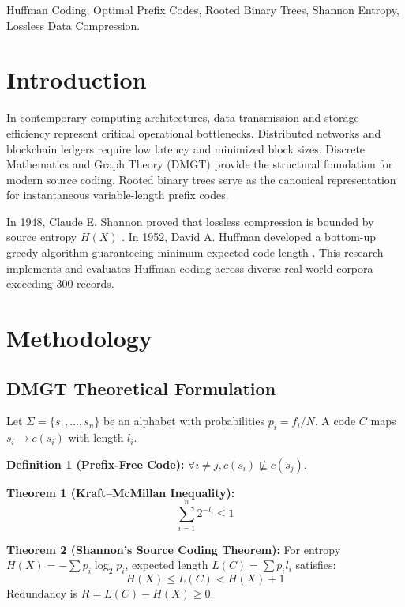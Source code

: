 \documentclass[conference]{IEEEtran}
\begin{document}
\begin{IEEEkeywords}
Huffman Coding, Optimal Prefix Codes, Rooted Binary Trees, Shannon Entropy, Lossless Data Compression.
\end{IEEEkeywords}

\section{Introduction}
In contemporary computing architectures, data transmission and storage efficiency represent critical operational bottlenecks. Distributed networks and blockchain ledgers require low latency and minimized block sizes. Discrete Mathematics and Graph Theory (DMGT) provide the structural foundation for modern source coding. Rooted binary trees serve as the canonical representation for instantaneous variable-length prefix codes.

In 1948, Claude E. Shannon proved that lossless compression is bounded by source entropy $H(X)$ \cite{shannon1948}. In 1952, David A. Huffman developed a bottom-up greedy algorithm guaranteeing minimum expected code length \cite{huffman1952}. This research implements and evaluates Huffman coding across diverse real-world corpora exceeding 300 records.

\section{Methodology}
\subsection{DMGT Theoretical Formulation}
Let $\Sigma = \{s_1, \dots, s_n\}$ be an alphabet with probabilities $p_i = f_i / N$. A code $C$ maps $s_i \to c(s_i)$ with length $l_i$.

\textbf{Definition 1 (Prefix-Free Code):} $\forall i \ne j, c(s_i) \not\sqsubseteq c(s_j)$.

\textbf{Theorem 1 (Kraft--McMillan Inequality):}
\begin{equation}
\sum_{i=1}^{n} 2^{-l_i} \le 1
\end{equation}

\textbf{Theorem 2 (Shannon's Source Coding Theorem):}
For entropy $H(X) = -\sum p_i \log_2 p_i$, expected length $L(C) = \sum p_i l_i$ satisfies:
\begin{equation}
H(X) \le L(C) < H(X) + 1
\end{equation}
Redundancy is $R = L(C) - H(X) \ge 0$.
\end{document}
